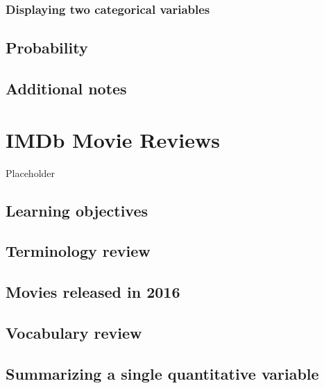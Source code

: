 \documentclass[
]{report}
\begin{document}
\hypertarget{displaying-two-categorical-variables}{%
\subsection{Displaying two categorical variables}\label{displaying-two-categorical-variables}}

\hypertarget{probability}{%
\section{Probability}\label{probability}}

\hypertarget{additional-notes}{%
\section{Additional notes}\label{additional-notes}}

\hypertarget{imdb-movie-reviews}{%
\chapter{IMDb Movie Reviews}\label{imdb-movie-reviews}}

Placeholder

\hypertarget{learning-objectives}{%
\section{Learning objectives}\label{learning-objectives}}

\hypertarget{terminology-review}{%
\section{Terminology review}\label{terminology-review}}

\hypertarget{movies-released-in-2016}{%
\section{Movies released in 2016}\label{movies-released-in-2016}}

\hypertarget{vocabulary-review}{%
\section{Vocabulary review}\label{vocabulary-review}}

\hypertarget{summarizing-a-single-quantitative-variable}{%
\section{Summarizing a single quantitative variable}\label{summarizing-a-single-quantitative-variable}}
\end{document}
